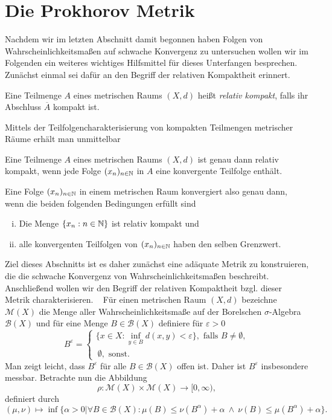 \section{Die Prokhorov Metrik}
Nachdem wir im letzten Abschnitt damit begonnen haben Folgen von Wahrscheinlichkeitsmaßen auf schwache Konvergenz zu untersuchen wollen wir im Folgenden ein weiteres wichtiges Hilfsmittel für dieses Unterfangen besprechen.
Zunächst einmal sei dafür an den Begriff der relativen Kompaktheit erinnert. 
\begin{mydef}
    Eine Teilmenge $A$ eines metrischen Raums $(X,d)$ heißt \textit{relativ kompakt}, falls ihr Abschluss $\overline{A}$ kompakt ist. 
\end{mydef}
Mittels der Teilfolgencharakterisierung von kompakten Teilmengen metrischer Räume erhält man unmittelbar

\begin{proposition}
    Eine Teilmenge $A$ eines metrischen Raums $(X,d)$ ist genau dann relativ kompakt, wenn jede Folge $(x_n)_{n \in \mathbb{N}}$ in $A$ eine konvergente Teilfolge enthält.
\end{proposition}
Eine Folge $(x_n)_{n \in \mathbb{N}}$ in einem metrischen Raum konvergiert also genau dann, wenn die beiden folgenden Bedingungen erfüllt sind
\begin{enumerate}[(i)]
    \item Die Menge $\{x_n : n \in \mathbb{N} \}$ ist relativ kompakt und
    \item alle konvergenten Teilfolgen von $(x_n)_{n \in \mathbb{N}}$ haben den selben Grenzwert. 
\end{enumerate}

Ziel dieses Abschnitts ist es daher zunächst eine adäquate Metrik zu konstruieren, die die schwache Konvergenz von Wahrscheinlichkeitsmaßen beschreibt. 
Anschließend wollen wir den Begriff der relativen Kompaktheit bzgl. dieser Metrik charakterisieren. 
\newline \ \newline
Für einen metrischen Raum $(X,d)$ bezeichne $\mathcal{M}(X)$ die Menge aller Wahrscheinlichkeitsmaße auf der Borelschen $\sigma$-Algebra $\mathcal{B}(X)$ und für eine Menge $B \in \mathcal{B}(X)$ definiere für $\varepsilon > 0$
$$
    B^{\varepsilon} = \begin{cases}
         \{x \in X: \inf_{y \in B}d(x,y) < \varepsilon\}, \text{ falls } B \neq \emptyset, \\\ 
        \emptyset, \text{ sonst.}
    \end{cases}
$$
Man zeigt leicht, dass $B^{\varepsilon}$ für alle $B\in \mathcal{B}(X)$ offen ist. Daher ist $B^{\varepsilon}$ insbesondere messbar. 
Betrachte nun die Abbildung 
$$
    \rho: \mathcal{M}(X) \times \mathcal{M}(X) \to [0, \infty),
$$
definiert durch
$$
    (\mu, \nu) \mapsto \inf\{\alpha > 0 | \forall B \in \mathcal{B}(X): \mu(B) \leq \nu(B^{\alpha}) + \alpha \ \land \ \nu(B) \leq \mu(B^{\alpha}) + \alpha \}.
$$

